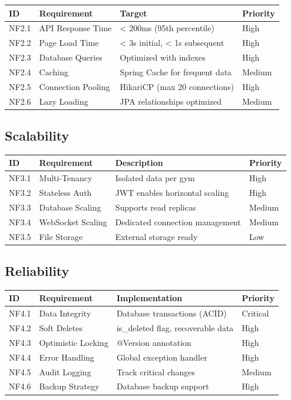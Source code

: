 \documentclass[
  12pt,
  a4paperpaper,
]{report}
\newcounter{none} %
\begin{document}
{\def\LTcaptype{none} %
\begin{longtable}[]{@{}llll@{}}
\hline
ID & Requirement & Target & Priority \\
\hline
\endhead
\hline
\endlastfoot
NF2.1 & API Response Time & \textless{} 200ms (95th percentile) &
High \\
NF2.2 & Page Load Time & \textless{} 3s initial, \textless{} 1s
subsequent & High \\
NF2.3 & Database Queries & Optimized with indexes & High \\
NF2.4 & Caching & Spring Cache for frequent data & Medium \\
NF2.5 & Connection Pooling & HikariCP (max 20 connections) & High \\
NF2.6 & Lazy Loading & JPA relationships optimized & Medium \\
\end{longtable}
}

\subsection{Scalability}\label{scalability}

{\def\LTcaptype{none} %
\begin{longtable}[]{@{}llll@{}}
\hline
ID & Requirement & Description & Priority \\
\hline
\endhead
\hline
\endlastfoot
NF3.1 & Multi-Tenancy & Isolated data per gym & High \\
NF3.2 & Stateless Auth & JWT enables horizontal scaling & High \\
NF3.3 & Database Scaling & Supports read replicas & Medium \\
NF3.4 & WebSocket Scaling & Dedicated connection management & Medium \\
NF3.5 & File Storage & External storage ready & Low \\
\end{longtable}
}

\clearpage
\subsection{Reliability}\label{reliability}

{\def\LTcaptype{none} %
\begin{longtable}[]{@{}llll@{}}
\hline
ID & Requirement & Implementation & Priority \\
\hline
\endhead
\hline
\endlastfoot
NF4.1 & Data Integrity & Database transactions (ACID) & Critical \\
NF4.2 & Soft Deletes & is\_deleted flag, recoverable data & High \\
NF4.3 & Optimistic Locking & @Version annotation & High \\
NF4.4 & Error Handling & Global exception handler & High \\
NF4.5 & Audit Logging & Track critical changes & Medium \\
NF4.6 & Backup Strategy & Database backup support & High \\
\end{longtable}
}
\end{document}
